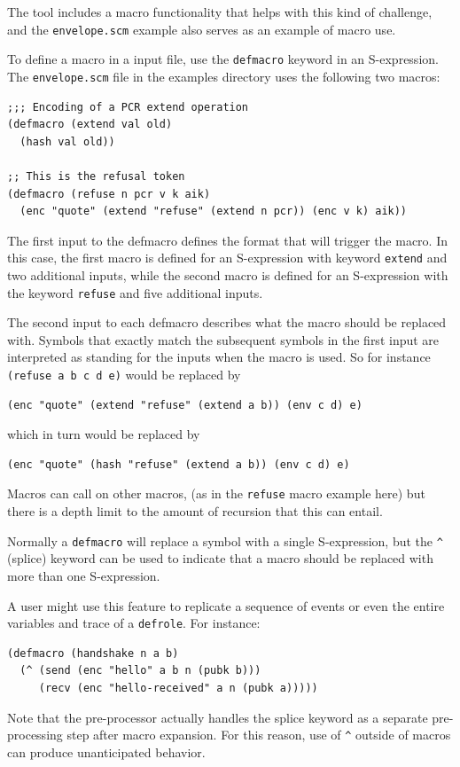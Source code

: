  
The {\cpsa} tool includes a macro functionality that helps with this
kind of challenge, and the \texttt{envelope.scm} example also serves
as an example of macro use.

To define a macro in a {\cpsa} input file, use the \texttt{defmacro}
keyword in an S-expression.  The \texttt{envelope.scm} file in the
examples directory uses the following two macros:

\begin{verbatim}
;;; Encoding of a PCR extend operation
(defmacro (extend val old)
  (hash val old))

;; This is the refusal token
(defmacro (refuse n pcr v k aik)
  (enc "quote" (extend "refuse" (extend n pcr)) (enc v k) aik))
\end{verbatim}

The first input to the defmacro defines the format that will trigger
the macro.  In this case, the first macro is defined for an
S-expression with keyword \texttt{extend} and two additional inputs,
while the second macro is defined for an S-expression with the keyword
\texttt{refuse} and five additional inputs.

The second input to each defmacro describes what the macro should be
replaced with.  Symbols that exactly match the subsequent symbols in
the first input are interpreted as standing for the inputs when the
macro is used.  So for instance \texttt{(refuse a b c d e)} would be
replaced by

\begin{verbatim}
(enc "quote" (extend "refuse" (extend a b)) (env c d) e)
\end{verbatim}

\noindent
which in turn would be replaced by

\begin{verbatim}
(enc "quote" (hash "refuse" (extend a b)) (env c d) e)
\end{verbatim}

\noindent
{} Macros can call on other macros, (as in the
\texttt{refuse} macro example here) but there is a depth limit to the
amount of recursion that this can entail.

 Normally a \texttt{defmacro} will
replace a symbol with a single S-expression, but the \texttt{\^}
(splice) keyword can be used to indicate that a macro should be
replaced with more than one S-expression.

A user might use this feature to replicate a sequence of events or even
the entire variables and trace of a \texttt{defrole}.  For instance:

\begin{verbatim}
(defmacro (handshake n a b)
  (^ (send (enc "hello" a b n (pubk b)))
     (recv (enc "hello-received" a n (pubk a)))))
\end{verbatim}

Note that the pre-processor actually handles the splice keyword as a
separate pre-processing step after macro expansion.  For this reason,
use of \texttt{\^} outside of macros can produce unanticipated behavior.

